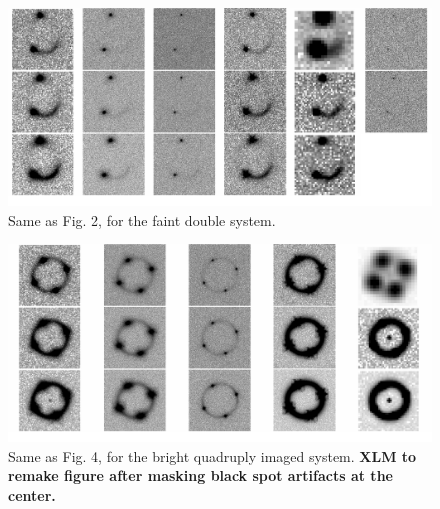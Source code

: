 \documentclass[a4paper,11pt]{article}
\begin{document}
{%
\begin{figure}
\begin{center}
\includegraphics[width=1.0\textwidth]{figures/fainter_system_2QSOimages_all.png}
\end{center}
\caption{Same as Fig. 2, for the faint double system.}
\label{fig:fainter_2QSOimages_montage}
\end{figure}

\begin{figure}
\begin{center}
\includegraphics[width=1.0\textwidth]{figures/brighter_system_4QSOimages_all.png}
\end{center}
\caption{Same as Fig. 4, for the bright quadruply imaged system. {\bf XLM to remake figure after masking black spot artifacts at the center.}
\label{fig:brighter_4QSOimages_montage}}
\end{figure}


}
\end{document}
